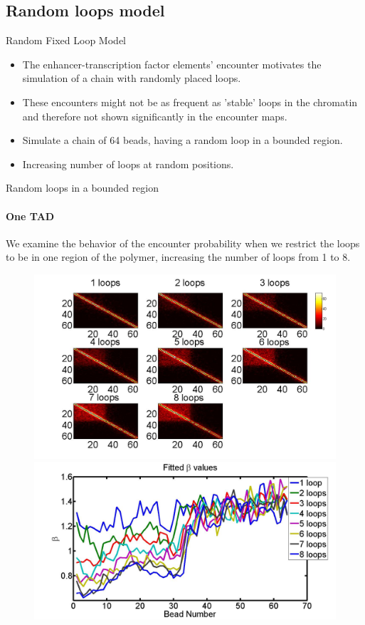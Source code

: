 \documentclass[8pt]{beamer}
\begin{document}
\subsection{Random loops model}\label{subsection_randomLoopsModel}
\begin{frame}{Random Fixed Loop Model}
\begin{itemize}
\item The enhancer-transcription factor elements' encounter motivates the simulation of a chain with randomly placed loops.
\item These encounters might not be as frequent as 'stable' loops in the chromatin and therefore not shown significantly in the encounter maps.
\item Simulate a chain of 64 beads, having a random loop in a bounded region.
\item Increasing number of loops at random positions. 
\end{itemize}

\end{frame}

\begin{frame}{Random loops in a bounded region}
\framesubtitle{One TAD}
We examine the behavior of the encounter probability when we restrict the loops to be in one region of the polymer, increasing the number of loops from 1 to 8.
\begin{figure}[H]
\includegraphics[scale=0.13]{encounterHistogramOneTAD_1to8Loops}
\includegraphics[scale=0.13]{fittedExpOneTAD1To8Loops}
\end{figure}
\end{frame}
\end{document}
